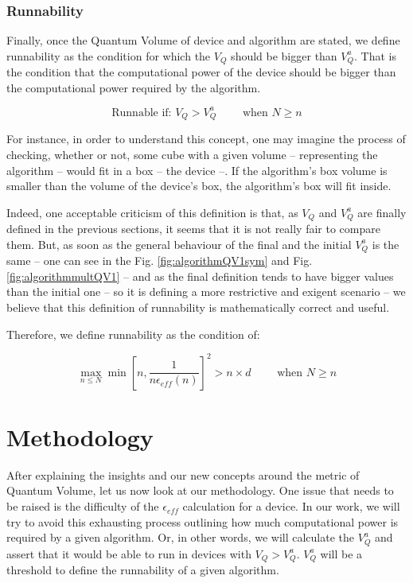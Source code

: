 \documentclass[11pt]{article}
\begin{document}
\subsubsection{Runnability}
\label{sec:orgc35c3be}

Finally, once the Quantum Volume of device and algorithm are stated, we define runnability as the condition for which the \(V_Q\) should be bigger than \(V^a_Q\).
That is the condition that the computational power of the device should be bigger than the computational power required by the algorithm.

$$\text{Runnable if: } V_Q > V^a_Q \quad \quad \text{ when } N \ge n$$

For instance, in order to understand this concept, one may imagine the process of checking, whether or not, some cube with a given volume -- representing the algorithm -- would fit in a box -- the device --.
If the algorithm's box volume is smaller than the volume of the device's box, the algorithm's box will fit inside.

Indeed, one acceptable criticism of this definition is that, as \(V_Q\) and \(V^a_Q\) are finally defined in the previous sections, it seems that it is not really fair to compare them.
But, as soon as the general behaviour of the final and the initial \(V^a_Q\) is the same -- one can see in the Fig. \ref{fig:algorithmQV1sym} and Fig. \ref{fig:algorithmmultQV1} -- and as the final definition tends to have bigger values than the initial one -- so it is defining a more restrictive and exigent scenario -- we believe that this definition of runnability is mathematically correct and useful.

Therefore, we define runnability as the condition of:

$$\max_{n \le N} \min \left[ n,\frac{1}{n \epsilon_{eff} (n)}\right]^2 > n \times d \quad \quad \text{ when } N \ge n$$

\section{Methodology}
\label{sec:org4199e9a}

After explaining the insights and our new concepts around the metric of Quantum Volume, let us now
look at our methodology.
One issue that needs to be raised is the difficulty of the \(\epsilon_{eff}\) calculation for a device.
In our work, we will try to avoid this exhausting process outlining how much computational power
is required by a given algorithm.
Or, in other words, we will calculate the \(V^a_Q\) and assert that it would be able to run in devices
with \(V_Q > V^a_Q\).
\(V^a_Q\) will be a threshold to define the runnability of a given algorithm.
\end{document}
